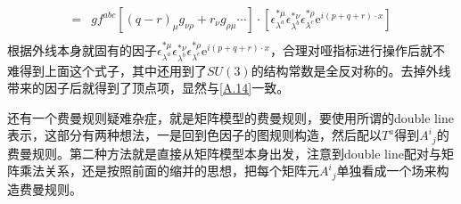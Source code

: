\begin{example}
\begin{equation}
\begin{aligned}
			=&gf^{abc}\left[(q-r)_\mu g_{\nu\rho}+r_\nu g_{\rho\mu}\cdots\right]\cdot\left[\epsilon_{\lambda^a}^{*\mu}\epsilon_{\lambda^b}^{*\nu}\epsilon^{*\rho}_{\lambda^c}\mathrm{e}^{i(p+q+r)\cdot x}\right]\\
		\end{aligned}
	\end{equation}
	根据外线本身就固有的因子$\epsilon_{\lambda^a}^{*\mu}\epsilon_{\lambda^b}^{*\nu}\epsilon^{*\rho}_{\lambda^c}\mathrm{e}^{i(p+q+r)\cdot x}$，合理对哑指标进行操作后就不难得到上面这个式子，其中还用到了$SU(3)$的结构常数是全反对称的。去掉外线带来的因子后就得到了顶点项，显然与\ref{A.14}一致。
\end{example}

还有一个费曼规则疑难杂症，就是矩阵模型的费曼规则，要使用所谓的double line表示，这部分有两种想法，一是回到色因子的图规则构造，然后配以$T^a$得到${A^i}_j$的费曼规则。第二种方法就是直接从矩阵模型本身出发，注意到double line配对与矩阵乘法关系，还是按照前面的缩并的思想，把每个矩阵元${A^i}_j$单独看成一个场来构造费曼规则。

